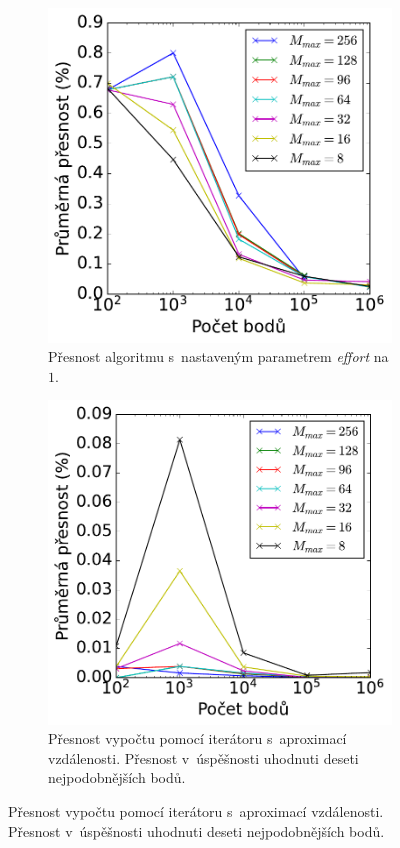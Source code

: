 \begin{figure}
\begin{subfigure}[t]{0.49\columnwidth}
\end{subfigure}
\hfill
\begin{subfigure}[t]{0.49\columnwidth}
    \centering  
    \includegraphics[scale=0.6]{obrazky-figures/benchmark/accuracy/normal/acccurucy_leaf1_err_cases.pdf}
    \caption{Přesnost algoritmu  s~nastaveným parametrem \emph{effort} na $1$.}
\end{subfigure}
\hfill
\begin{subfigure}[t]{0.49\columnwidth}
    \includegraphics[scale=0.6]{obrazky-figures/benchmark/accuracy/normal/acccurucy_it_err_cases.pdf}
    \centering  
    \caption{Přesnost vypočtu pomocí iterátoru s~aproximací vzdálenosti. Přesnost v~úspěšnosti uhodnuti deseti nejpodobnějších bodů. }


\end{subfigure}
\end{figure}
